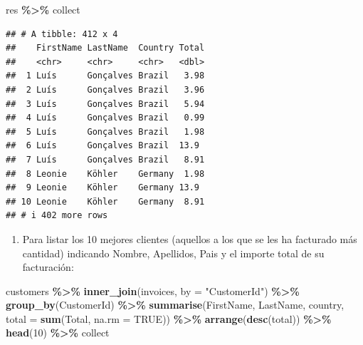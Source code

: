 \documentclass[
]{book}
\newenvironment{Shaded}{\begin{snugshade}}{\end{snugshade}}
\newcommand{\AttributeTok}[1]{\textcolor[rgb]{0.13,0.29,0.53}{#1}}
\newcommand{\ConstantTok}[1]{\textcolor[rgb]{0.56,0.35,0.01}{#1}}
\newcommand{\DecValTok}[1]{\textcolor[rgb]{0.00,0.00,0.81}{#1}}
\newcommand{\FunctionTok}[1]{\textcolor[rgb]{0.13,0.29,0.53}{\textbf{#1}}}
\newcommand{\NormalTok}[1]{#1}
\newcommand{\SpecialCharTok}[1]{\textcolor[rgb]{0.81,0.36,0.00}{\textbf{#1}}}
\newcommand{\StringTok}[1]{\textcolor[rgb]{0.31,0.60,0.02}{#1}}
\providecommand{\tightlist}{%
  \setlength{\itemsep}{0pt}\setlength{\parskip}{0pt}}
\begin{document}
\begin{Shaded}
\begin{Highlighting}[]
\NormalTok{res  }\SpecialCharTok{\%\textgreater{}\%}\NormalTok{ collect}
\end{Highlighting}
\end{Shaded}

\begin{verbatim}
## # A tibble: 412 x 4
##    FirstName LastName  Country Total
##    <chr>     <chr>     <chr>   <dbl>
##  1 Luís      Gonçalves Brazil   3.98
##  2 Luís      Gonçalves Brazil   3.96
##  3 Luís      Gonçalves Brazil   5.94
##  4 Luís      Gonçalves Brazil   0.99
##  5 Luís      Gonçalves Brazil   1.98
##  6 Luís      Gonçalves Brazil  13.9 
##  7 Luís      Gonçalves Brazil   8.91
##  8 Leonie    Köhler    Germany  1.98
##  9 Leonie    Köhler    Germany 13.9 
## 10 Leonie    Köhler    Germany  8.91
## # i 402 more rows
\end{verbatim}

\begin{enumerate}
\def\labelenumi{\arabic{enumi}.}
\setcounter{enumi}{4}
\tightlist
\item
  Para listar los 10 mejores clientes (aquellos a los que se les ha facturado más cantidad) indicando Nombre, Apellidos, Pais y el importe total de su facturación:
\end{enumerate}

\begin{Shaded}
\begin{Highlighting}[]
\NormalTok{customers }\SpecialCharTok{\%\textgreater{}\%} \FunctionTok{inner\_join}\NormalTok{(invoices, }\AttributeTok{by =} \StringTok{"CustomerId"}\NormalTok{) }\SpecialCharTok{\%\textgreater{}\%} \FunctionTok{group\_by}\NormalTok{(CustomerId) }\SpecialCharTok{\%\textgreater{}\%} 
    \FunctionTok{summarise}\NormalTok{(FirstName, LastName, country, }\AttributeTok{total =} \FunctionTok{sum}\NormalTok{(Total, }\AttributeTok{na.rm =} \ConstantTok{TRUE}\NormalTok{)) }\SpecialCharTok{\%\textgreater{}\%}  
    \FunctionTok{arrange}\NormalTok{(}\FunctionTok{desc}\NormalTok{(total)) }\SpecialCharTok{\%\textgreater{}\%} \FunctionTok{head}\NormalTok{(}\DecValTok{10}\NormalTok{) }\SpecialCharTok{\%\textgreater{}\%}\NormalTok{ collect}
\end{Highlighting}
\end{Shaded}
\end{document}
